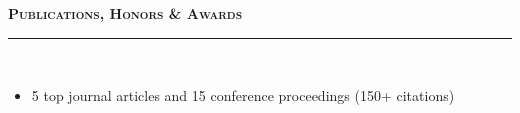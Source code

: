 \documentclass[11pt]{article}
\newcommand{\sep}{\ding{118}\;}
\begin{document}
\vspace{6pt}

\textbf{\textsc{\LARGE{Publications, Honors \& Awards}}} \\ \rule[0.8em]{\textwidth}{0.5pt} \\[-18pt]

\begin{itemize}[topsep=0pt,partopsep=0pt,leftmargin=16pt]
\item 5 top journal articles and 15 conference proceedings (150+ citations) 
\end{itemize}
%


\end{document}
